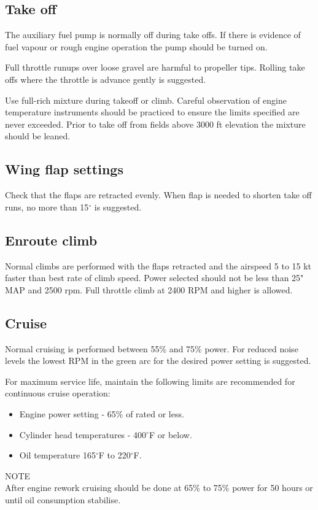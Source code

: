 \subsection{Take off}
The auxiliary fuel pump is normally off during take offs.  If there is evidence of fuel vapour or rough engine operation the pump should be turned on.

Full throttle runups over loose gravel are harmful to propeller tips.  Rolling take offs where the throttle is advance gently is suggested.  

Use full-rich mixture during takeoff or climb. Careful observation of engine temperature instruments should be practiced to ensure the limits specified are never exceeded.
Prior to take off from fields above 3000 ft elevation the mixture should be leaned.


\subsection{Wing flap settings}
Check that the flaps are retracted evenly. When flap is needed to shorten take off runs, no more than 15$^{\circ}$ is suggested.

\subsection{Enroute climb}
Normal climbs are performed with the flaps retracted and the airspeed 5 to 15 kt faster than best rate of climb speed.  Power selected should not be less than 25" MAP and 2500 rpm. Full throttle climb at 2400 RPM and higher is allowed. 

\subsection{Cruise}
Normal cruising is performed between 55\% and 75\% power.  
For reduced noise levels the lowest RPM in the green arc for the desired power setting is suggested.

For maximum service life, maintain the following limits are recommended for continuous cruise operation:\\
\begin{itemize}
\item Engine power setting - 65\% of rated or less.
\item Cylinder head temperatures - 400$^{\circ}$F or below.
\item Oil temperature 165$^{\circ}$F to 220$^{\circ}$F.
\end{itemize}
\begin{center}
NOTE\\

After engine rework cruising should be done at 65\% to 75\% power for 50 hours or until oil consumption stabilise.
\end{center}


